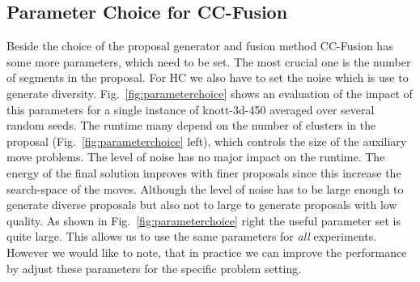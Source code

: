 \documentclass[10pt,twocolumn,letterpaper]{article}
\theoremstyle{definition}
\begin{document}
\subsection{Parameter Choice for CC-Fusion}
Beside the choice of the proposal generator and fusion method CC-Fusion has some more parameters, which need to be set.
The most crucial one is the number of segments in the proposal. For HC we also have to set the noise which is use to generate diversity.
Fig.~\ref{fig:parameterchoice} shows an evaluation of the impact of this parameters for a single instance of knott-3d-450 averaged over several random seeds.
The runtime many depend on the number of clusters in the proposal (Fig.~\ref{fig:parameterchoice} left), which controls the size of the auxiliary move problems.
The level of noise has no major impact on the runtime.
The energy of the final solution improves with finer proposals since this increase the search-space of the moves.
Although the level of noise has to be large enough to generate diverse proposals but also not to large to generate proposals with low quality.
As shown in Fig.~\ref{fig:parameterchoice} right the useful parameter set is quite large. This allows us to use the same parameters for \emph{all}
experiments. However we would like to note, that in practice we can improve the performance by adjust these parameters for the specific problem setting.
%
%
\end{document}

